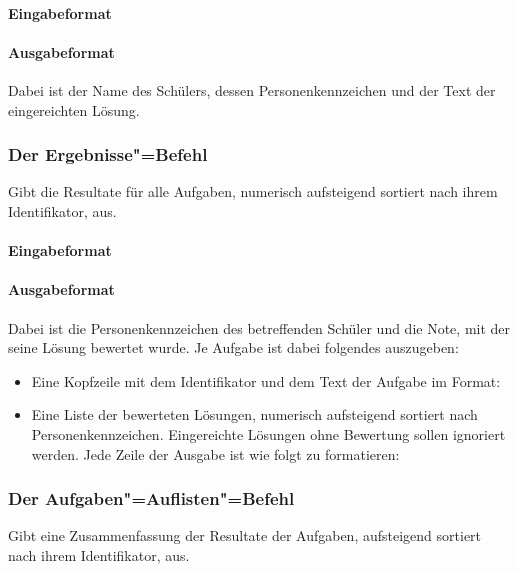 \documentclass{sdqassignment}
\begin{document}
\paragraph{Eingabeformat}
\paragraph{Ausgabeformat}
Dabei ist  der Name des Schülers,  dessen Personenkennzeichen und  der Text der eingereichten Lösung.


\subsubsection{Der Ergebnisse"=Befehl}
Gibt die Resultate für alle Aufgaben, numerisch aufsteigend sortiert nach ihrem Identifikator, aus.
\paragraph{Eingabeformat}
\paragraph{Ausgabeformat}
Dabei ist  die Personenkennzeichen des betreffenden Schüler und  die Note, mit der seine Lösung bewertet wurde. Je Aufgabe ist dabei folgendes auszugeben:
\begin{itemize}
    \item Eine Kopfzeile mit dem Identifikator  und dem Text der Aufgabe  im Format:


    \item Eine Liste der bewerteten Lösungen, numerisch aufsteigend sortiert nach Personenkennzeichen. Eingereichte Lösungen ohne Bewertung sollen ignoriert werden. Jede Zeile der Ausgabe ist wie folgt zu formatieren:

\end{itemize}

\subsubsection{Der Aufgaben"=Auflisten"=Befehl}
Gibt eine Zusammenfassung der Resultate der Aufgaben, aufsteigend sortiert nach ihrem Identifikator, aus.
\end{document}
